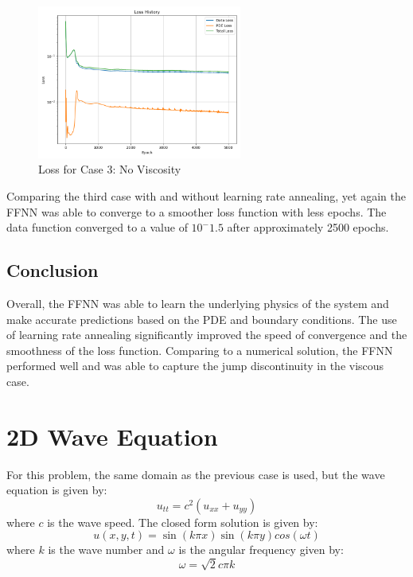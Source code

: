 \documentclass[11pt]{article}
\begin{document}
\begin{figure}[h]
    \centering
    \includegraphics[width=0.6\textwidth]{1D_Loss_NU3_Annealing.png}
    \caption{Loss for Case 3: No Viscosity}
    \label{fig:Loss_NU3_LR}
\end{figure}

Comparing the third case with and without learning rate annealing, yet again the FFNN was able to converge to a smoother loss function with less epochs. The data function converged to a value of $10^-1.5$ after approximately 2500 epochs.

\subsection{Conclusion}

Overall, the FFNN was able to learn the underlying physics of the system and make accurate predictions based on the PDE and boundary conditions. The use of learning rate annealing significantly improved the speed of convergence and the smoothness of the loss function. Comparing to a numerical solution, the FFNN performed well and was able to capture the jump discontinuity in the viscous case.

\pagebreak

\section{2D Wave Equation}
For this problem, the same domain as the previous case is used, but the wave equation is given by:
\begin{equation}
    u_{tt} = c^2 (u_{xx} + u_{yy})
\end{equation}
where $c$ is the wave speed. The closed form solution is given by:
\begin{equation}
    u(x, y, t) = \sin(k \pi x) \sin(k \pi y)cos(\omega t) 
\end{equation}
where $k$ is the wave number and $\omega$ is the angular frequency given by:
\begin{equation}
    \omega = \sqrt{2} c \pi k
\end{equation}
\end{document}
